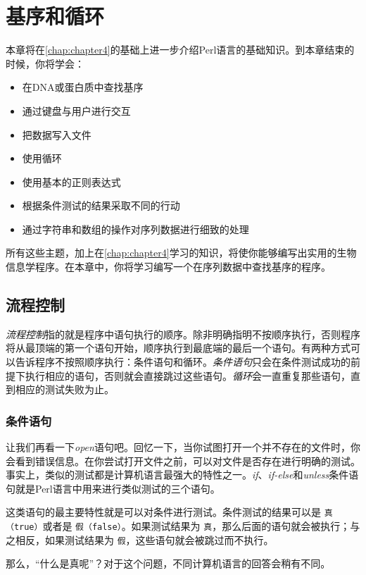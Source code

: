\chapter{基序和循环}
\label{chap:chapter5}
\minitoc

本章将在\autoref{chap:chapter4}的基础上进一步介绍Perl语言的基础知识。到本章结束的时候，你将学会：

\begin{itemize}
  \item 在DNA或蛋白质中查找基序
  \item 通过键盘与用户进行交互
  \item 把数据写入文件
  \item 使用循环
  \item 使用基本的正则表达式
  \item 根据条件测试的结果采取不同的行动
  \item 通过字符串和数组的操作对序列数据进行细致的处理
\end{itemize}

所有这些主题，加上在\autoref{chap:chapter4}学习的知识，将使你能够编写出实用的生物信息学程序。在本章中，你将学习编写一个在序列数据中查找基序的程序。

\section{流程控制}
\textit{流程控制}指的就是程序中语句执行的顺序。除非明确指明不按顺序执行，否则程序将从最顶端的第一个语句开始，顺序执行到最底端的最后一个语句。有两种方式可以告诉程序不按照顺序执行：条件语句和循环。\textit{条件语句}只会在条件测试成功的前提下执行相应的语句，否则就会直接跳过这些语句。\textit{循环}会一直重复那些语句，直到相应的测试失败为止。

\subsection{条件语句}
让我们再看一下\textit{open}语句吧。回忆一下，当你试图打开一个并不存在的文件时，你会看到错误信息。在你尝试打开文件之前，可以对文件是否存在进行明确的测试。事实上，类似的测试都是计算机语言最强大的特性之一。\textit{if}、\textit{if-else}和\textit{unless}条件语句就是Perl语言中用来进行类似测试的三个语句。

这类语句的最主要特性就是可以对条件进行测试。条件测试的结果可以是 \verb|真（true）|或者是 \verb|假（false）|。如果测试结果为 \verb|真|，那么后面的语句就会被执行；与之相反，如果测试结果为 \verb|假|，这些语句就会被跳过而不执行。

那么，“什么是真呢”？对于这个问题，不同计算机语言的回答会稍有不同。

